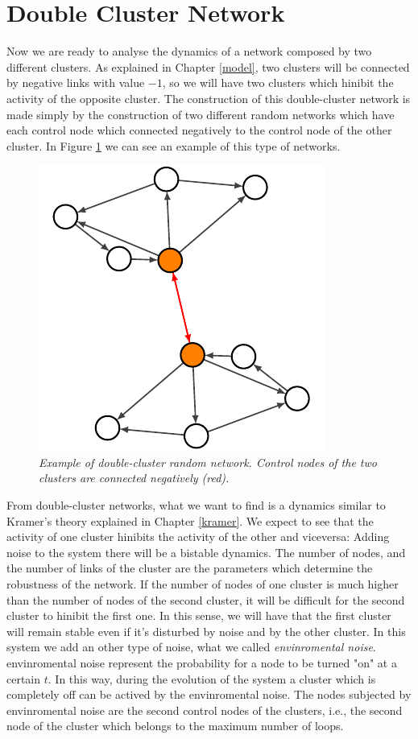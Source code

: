 \newpage
\section{Double Cluster Network}
Now we are ready to analyse the dynamics of a network composed by two different clusters. As explained in Chapter \ref{model}, two clusters will be connected by negative links with value $-1$, so we will have two clusters which hinibit the activity of the opposite cluster.
The construction of this double-cluster network is made simply by the construction of two different random networks which have each control node which connected negatively to the control node of the other cluster. In Figure \ref{fig:doublecluster} we can see an example of this type of networks.

\begin{figure}[h]
\centering
\includegraphics[scale=1.4]{images/doublecluster.pdf}
\caption{\emph{Example of double-cluster random network. Control nodes of the two clusters are connected negatively (red).}}
\label{fig:doublecluster}
\end{figure}

From double-cluster networks, what we want to find is a dynamics similar to Kramer's theory explained in Chapter \ref{kramer}. We expect to see that the activity of one cluster hinibits the activity of the other and viceversa: Adding noise to the system there will be a bistable dynamics.
The number of nodes, and the number of links of the cluster are the parameters which determine the robustness of the network. If the number of nodes of one cluster is much higher than the number of nodes of the second cluster, it will be difficult for the second cluster to hinibit the first one.
In this sense, we will have that the first cluster will remain stable even if it's disturbed by noise and by the other cluster.
In this system we add an other type of noise, what we called \emph{envinromental noise}.
envinromental noise represent the probability for a node to be turned "on" at a certain $t$. In this way, during the evolution of the system a cluster which is completely off can be actived by the envinromental noise.
The nodes subjected by envinromental noise are the second control nodes of the clusters, i.e., the second node of the cluster which belongs to the maximum number of loops.
